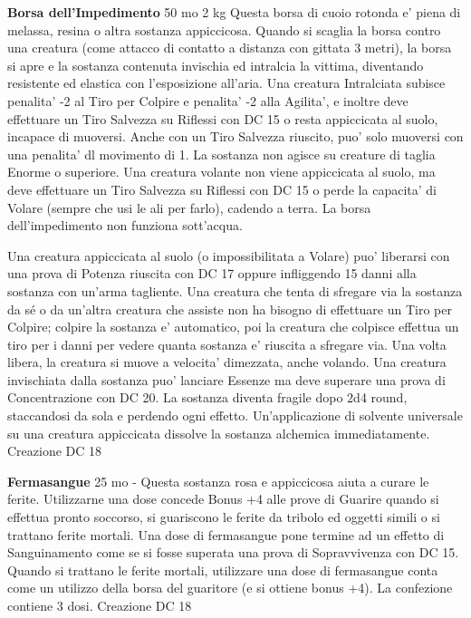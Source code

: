 \documentclass[a4paper,11pt,twoside,openany]{book}
\begin{document}
{\textbf{Borsa dell'Impedimento} 50 mo 2 kg Questa borsa di cuoio rotonda e' piena di melassa, resina o altra sostanza appiccicosa. Quando si scaglia la borsa contro una creatura (come attacco di contatto a distanza con gittata 3 metri), la borsa si apre e la sostanza contenuta invischia ed intralcia la vittima, diventando resistente ed elastica con l'esposizione all'aria. Una creatura Intralciata subisce penalita' -2 al Tiro per Colpire e penalita' -2 alla Agilita', e inoltre deve effettuare un Tiro Salvezza su Riflessi con DC 15 o resta appiccicata al suolo, incapace di muoversi. Anche con un Tiro Salvezza riuscito, puo' solo muoversi con una penalita' dl movimento di 1.
La sostanza non agisce su creature di taglia Enorme o superiore. Una creatura volante non viene appiccicata al suolo, ma deve effettuare un Tiro Salvezza su Riflessi con DC 15 o perde la capacita' di Volare (sempre che usi le ali per farlo), cadendo a terra. La borsa dell'impedimento non funziona sott'acqua.

Una creatura appiccicata al suolo (o impossibilitata a Volare) puo' liberarsi con una prova di Potenza riuscita con DC 17 oppure infliggendo 15 danni alla sostanza con un'arma tagliente. Una creatura che tenta di sfregare via la sostanza da sé o da un'altra creatura che assiste non ha bisogno di effettuare un Tiro per Colpire; colpire la sostanza e' automatico, poi la creatura che colpisce effettua un tiro per i danni per vedere quanta sostanza e' riuscita a sfregare via. Una volta libera, la creatura si muove a velocita' dimezzata, anche volando. Una creatura invischiata dalla sostanza puo' lanciare Essenze ma deve superare una prova di Concentrazione con DC 20. La sostanza diventa fragile dopo 2d4 round, staccandosi da sola e perdendo ogni effetto. Un'applicazione di solvente universale su una creatura appiccicata dissolve la sostanza alchemica immediatamente. Creazione DC 18

\textbf{Fermasangue} 25 mo - Questa sostanza rosa e appiccicosa aiuta a curare le ferite. Utilizzarne una dose concede Bonus +4 alle prove di Guarire quando si effettua pronto soccorso, si guariscono le ferite da tribolo ed oggetti simili o si trattano ferite mortali. Una dose di fermasangue pone termine ad un effetto di Sanguinamento come se si fosse superata una prova di Sopravvivenza con DC 15. Quando si trattano le ferite mortali, utilizzare una dose di fermasangue conta come un utilizzo della borsa del guaritore (e si ottiene bonus +4). La confezione contiene 3 dosi. Creazione DC 18

}
\end{document}
